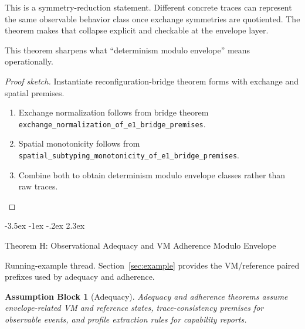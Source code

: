 \documentclass[a4paper,10pt,twocolumn,english]{article}
\makeatletter
\renewcommand{\section}{\@startsection{section}{1}{\z@}%
  {-3.5ex \@plus -1ex \@minus -.2ex}%
  {2.3ex}%
  {\raggedright\normalfont\large\bfseries}}
\numberwithin{equation}{section}
\theoremstyle{paperdef}
\theoremstyle{paperplain}
\theoremstyle{paperdef}
\theoremstyle{paperremark}
\theoremstyle{paperdef}
\newtheorem{assumptions}[assumption]{Assumption Block}
\makeatother
\begin{document}
This is a symmetry-reduction statement. Different concrete traces can represent the same observable behavior class once exchange symmetries are quotiented. The theorem makes that collapse explicit and checkable at the envelope layer.

This theorem sharpens what ``determinism modulo envelope'' means operationally.

\begin{proof}[Proof sketch]
	Instantiate reconfiguration-bridge theorem forms with exchange and spatial premises.

	\begin{enumerate}
		\item Exchange normalization follows from bridge theorem \nolinkurl{exchange_normalization_of_e1_bridge_premises}.
		\item Spatial monotonicity follows from \nolinkurl{spatial_subtyping_monotonicity_of_e1_bridge_premises}.
		\item Combine both to obtain determinism modulo envelope classes rather than raw traces.
	\end{enumerate}
\end{proof}

\section{Theorem H: Observational Adequacy and VM Adherence Modulo Envelope}
\label{sec:theorem-h}

Running-example thread. Section~\ref{sec:example} provides the VM/reference
paired prefixes used by adequacy and adherence.

\begin{assumptions}[Adequacy]
	\label{assump:p3-adequacy}
	Adequacy and adherence theorems assume envelope-related VM and reference states, trace-consistency premises for observable events, and profile extraction rules for capability reports.
\end{assumptions}
\end{document}
